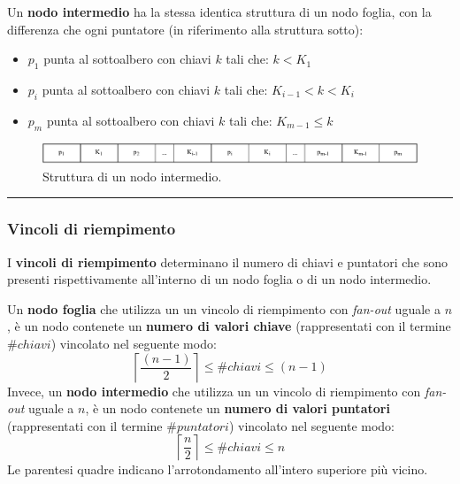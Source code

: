 \documentclass[a4paper]{article}
\newcommand{\longline}{\noindent\rule{\textwidth}{0.4pt}}
\begin{document}
	Un \textcolor{Red3}{\textbf{nodo intermedio}} ha la stessa identica struttura di un nodo foglia, con la differenza che ogni puntatore (in riferimento alla struttura sotto):
	\begin{itemize}
		\item $p_{1}$ punta al sottoalbero con chiavi $k$ tali che: $k < K_{1}$
		
		\item $p_{i}$ punta al sottoalbero con chiavi $k$ tali che: $K_{i-1} < k < K_{i}$
		
		\item $p_{m}$ punta al sottoalbero con chiavi $k$ tali che: $K_{m-1} \le k$
	\end{itemize}
	\begin{figure}[!htp]
		\centering
		\includegraphics[width=\textwidth]{img/B+-tree_intermedio.pdf}
		\caption{Struttura di un nodo intermedio.}
	\end{figure}

	\longline
	
	\subsubsection{Vincoli di riempimento}\label{vincoli di riempimento}
	
	I \textcolor{Red3}{\textbf{vincoli di riempimento}} determinano il numero di chiavi e puntatori che sono presenti rispettivamente all'interno di un nodo foglia o di un nodo intermedio.\newline
	
	\noindent
	Un \textbf{nodo foglia} che utilizza un un vincolo di riempimento con \emph{fan-out} uguale a $n$, è un nodo contenete un \textbf{numero di valori chiave} (rappresentati con il termine $\#chiavi$) vincolato nel seguente modo:
	\begin{equation*}
		\left\lceil \dfrac{\left(n-1\right)}{2} \right\rceil \le \#chiavi \le \left(n-1\right)
	\end{equation*}
	Invece, un \textbf{nodo intermedio} che utilizza un un vincolo di riempimento con \emph{fan-out} uguale a $n$, è un nodo contenete un \textbf{numero di valori puntatori} (rappresentati con il termine $\#puntatori$) vincolato nel seguente modo:
	\begin{equation*}
		\left\lceil \dfrac{n}{2} \right\rceil \le \#chiavi \le n
	\end{equation*}
	Le parentesi quadre indicano l'arrotondamento all'intero superiore più vicino.\newpage
	
\end{document}
